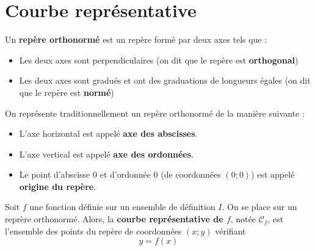 \documentclass{article}
\begin{document}
\section{Courbe représentative}
\begin{tcolorbox}
\begin{definition}
Un \textbf{repère orthonormé} est un repère formé par deux axes tels que :
\begin{itemize}
\item Les deux axes sont perpendiculaires (on dit que le repère est \textbf{orthogonal})
\item Les deux axes sont gradués et ont des graduations de longueurs égales (on dit que le repère est \textbf{normé})
\end{itemize}
\end{definition}
\end{tcolorbox}
\begin{example} On représente traditionnellement un repère orthonormé de la manière suivante :
\begin{center}
\end{center}
\begin{itemize}
\item L'axe horizontal est appelé \textbf{axe des abscisses}.
\item L'axe vertical est appelé \textbf{axe des ordonnées}.
\item Le point d'abscisse $0$ et d'ordonnée $0$ (de coordonnées $(0;0)$) est appelé \textbf{origine du repère}.
\end{itemize}
\end{example}
\begin{tcolorbox}
\begin{definition}
Soit $f$ une fonction définie sur un ensemble de définition $I$. On se place sur un reprère orthonormé. Alors, la \textbf{courbe représentative de $f$}, notée $\mathcal{C}_f$, est l'ensemble des points du repère de coordonnées $(x;y)$ vérifiant
\begin{equation*}
y = f(x)
\end{equation*}
\end{definition}
\end{tcolorbox}
\end{document}
